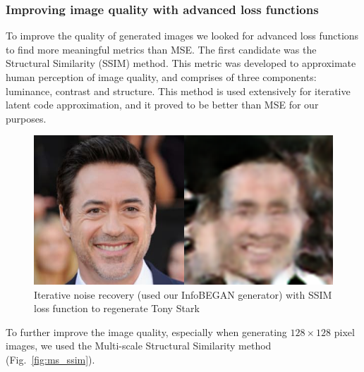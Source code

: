 \documentclass{egpubl}
\begin{document}
\subsubsection{Improving image quality with advanced loss functions}

To improve the quality of generated images we looked for advanced loss functions to find more meaningful metrics than MSE.
The first candidate was the Structural Similarity (SSIM) method. This metric was developed to approximate human perception of image quality, and comprises of three components: luminance, contrast and structure. This method is used extensively for iterative latent code approximation, and it proved to be better than MSE for our purposes.

\begin{figure}[!htb]
	\centering
	\includegraphics[width=1\linewidth]{pic/InfoBEGAN_tony_recovered_ssim}
	\caption{Iterative noise recovery (used our InfoBEGAN generator) with SSIM loss function to regenerate Tony Stark}

\end{figure}

To further improve the image quality, especially when generating $128\times 128$ pixel images, we used the Multi-scale Structural Similarity method (Fig.~\ref{fig:ms_ssim}).
\end{document}
